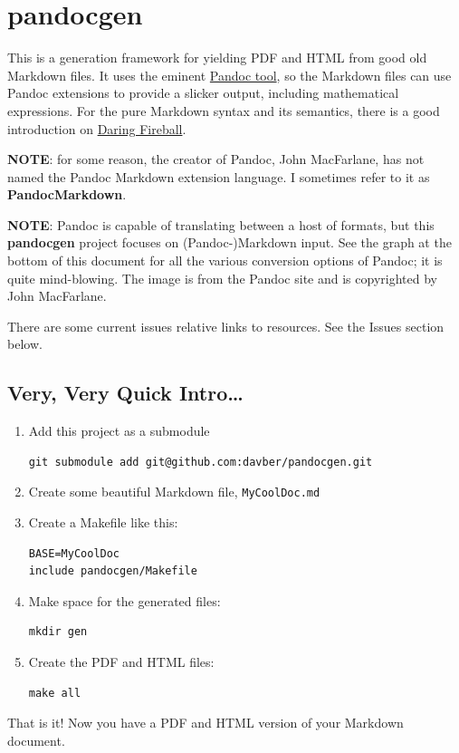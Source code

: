 \documentclass[oneside,]{memoir}
\begin{document}
\chapter{pandocgen}

This is a generation framework for yielding PDF and HTML from good old
Markdown files. It uses the eminent
\href{http://johnmacfarlane.net/pandoc/}{Pandoc tool}, so the Markdown
files can use Pandoc extensions to provide a slicker output, including
mathematical expressions. For the pure Markdown syntax and its
semantics, there is a good introduction on
\href{http://daringfireball.net/projects/markdown/syntax/}{Daring
Fireball}.

\textbf{NOTE}: for some reason, the creator of Pandoc, John MacFarlane,
has not named the Pandoc Markdown extension language. I sometimes refer
to it as \textbf{PandocMarkdown}.

\textbf{NOTE}: Pandoc is capable of translating between a host of
formats, but this \textbf{pandocgen} project focuses on
(Pandoc-)Markdown input. See the graph at the bottom of this document
for all the various conversion options of Pandoc; it is quite
mind-blowing. The image is from the Pandoc site and is copyrighted by
John MacFarlane.

There are some current issues relative links to resources. See the
Issues section below.

\section{Very, Very Quick Intro\ldots{}}

\begin{enumerate}[1.]
\item
  Add this project as a submodule

\begin{verbatim}
git submodule add git@github.com:davber/pandocgen.git
\end{verbatim}
\item
  Create some beautiful Markdown file, \texttt{MyCoolDoc.md}
\item
  Create a Makefile like this:

\begin{verbatim}
BASE=MyCoolDoc
include pandocgen/Makefile
\end{verbatim}
\item
  Make space for the generated files:

\begin{verbatim}
mkdir gen
\end{verbatim}
\item
  Create the PDF and HTML files:

\begin{verbatim}
make all
\end{verbatim}
\end{enumerate}
That is it! Now you have a PDF and HTML version of your Markdown
document.
\end{document}
